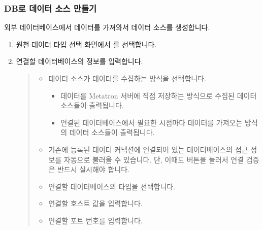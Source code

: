 \documentclass[letterpaper,10pt,english]{sphinxmanual}
\begin{document}
\subsubsection{DB로 데이터 소스 만들기}
\label{\detokenize{discovery/part02/create_a_data_source:db}}\label{\detokenize{discovery/part02/create_a_data_source:create-datasource-from-db}}
외부 데이터베이스에서 데이터를 가져와서 데이터 소스를 생성합니다.
\begin{enumerate}
\def\theenumi{\arabic{enumi}}
\def\labelenumi{\theenumi .}
\makeatletter\def\p@enumii{\p@enumi \theenumi .}\makeatother
\item {} 
원천 데이터 타입 선택 화면에서 를 선택합니다.

\item {} 
연결할 데이터베이스의 정보를 입력합니다.
\begin{quote}

\begin{figure}[H]
\centering

\noindent{}
\end{figure}
\begin{itemize}
\item {} 
 데이터 소스가 데이터를 수집하는 방식을 선택합니다.
\begin{itemize}
\item {} 
 데이터를 Metatron 서버에 직접 저장하는 방식으로 수집된 데이터 소스들이 출력됩니다.

\item {} 
 연결된 데이터베이스에서 필요한 시점마다 데이터를 가져오는 방식의 데이터 소스들이 출력됩니다.

\end{itemize}

\item {} 
 기존에 등록된 데이터 커넥션에 연결되어 있는 데이터베이스의 접근 정보를 자동으로 불러올 수 있습니다. 단, 이때도  버튼을 눌러서 연결 검증은 반드시 실시해야 합니다.

\item {} 
 연결할 데이터베이스의 타입을 선택합니다.

\item {} 
 연결할 호스트 값을 입력합니다.

\item {} 
 연결할 포트 번호를 입력합니다.


\end{itemize}
\end{quote}
\end{enumerate}
\end{document}
